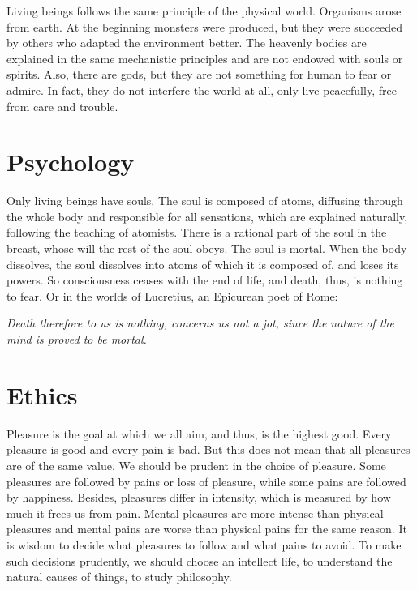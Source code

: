 \documentclass[11pt]{article}
\begin{document}
\newline

Living beings follows the same principle of the physical world. 
Organisms arose from earth. 
At the beginning monsters were produced, but they were succeeded by others who adapted the environment better. 
The heavenly bodies are explained in the same mechanistic principles and are not endowed with souls or spirits. 
Also, there are gods, but they are not something for human to fear or admire. 
In fact, they do not interfere the world at all, only live peacefully, free from care and trouble.

\section{Psychology}
Only living beings have souls. 
The soul is composed of atoms, diffusing through the whole body and responsible for all sensations, which are explained naturally, following the teaching of atomists. 
There is a rational part of the soul in the breast, whose will the rest of the soul obeys. 
The soul is mortal. 
When the body dissolves, the soul dissolves into atoms of which it is composed of, and loses its powers. 
So consciousness ceases with the end of life, and death, thus, is nothing to fear. 
Or in the worlds of Lucretius, an Epicurean poet of Rome:

\textit{Death therefore to us is nothing, concerns us not a jot, since the nature of the mind is proved to be mortal.}

\section{Ethics}
Pleasure is the goal at which we all aim, and thus, is the highest good. 
Every pleasure is good and every pain is bad. 
But this does not mean that all pleasures are of the same value. 
We should be prudent in the choice of pleasure. 
Some pleasures are followed by pains or loss of pleasure, while some pains are followed by happiness. 
Besides, pleasures differ in intensity, which is measured by how much it frees us from pain. 
Mental pleasures are more intense than physical pleasures and mental pains are worse than physical pains for the same reason. 
It is wisdom to decide what pleasures to follow and what pains to avoid. 
To make such decisions prudently, we should choose an intellect life, to understand the natural causes of things, to study philosophy.

\newline
\end{document}
